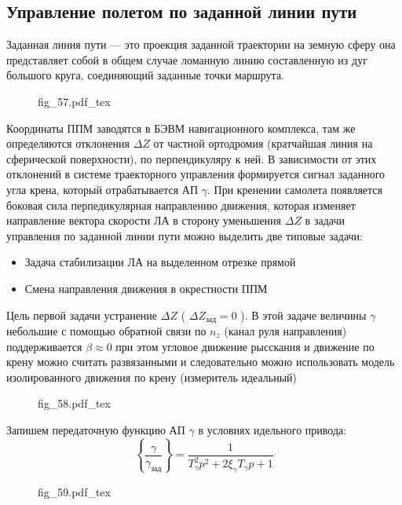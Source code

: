 \documentclass{article}
\newcommand{\incfig}[1]{
    {#1.pdf_tex}
}
\begin{document}
\subsection{Управление полетом по заданной линии пути}
Заданная линия пути --- это проекция заданной траектории на земную сферу она представляет собой в общем случае ломанную линию составленную из дуг большого круга, соединяющий заданные точки маршрута. 

\begin{figure}[ht]
	\centering
	\incfig{fig_57}
	\label{fig:fig_57}
\end{figure}

Координаты ППМ заводятся в БЭВМ навигационного комплекса, там же определяются отклонения $ \Delta Z$ от частной ортодромия (кратчайшая линия на сферической поверхности), по перпендикуляру к ней. В зависимости от этих отклонений в системе траекторного управления формируется сигнал заданного угла крена, который отрабатывается АП $\gamma$. При кренении самолета появляется боковая сила перпедикулярная направлению движения, которая изменяет направление вектора скорости ЛА в сторону уменьшения $\Delta Z$
в задачи управления по заданной линии пути можно выделить две типовые задачи:
\begin{itemize}
	\item Задача стабилизации ЛА на выделенном отрезке прямой
	\item Смена направления движения в окрестности ППМ
\end{itemize}
Цель первой задачи устранение $ \Delta Z$ ( $\Delta Z_\text{зад} = 0$ ). В этой задаче величины $\gamma$ небольшие с помощью обратной связи по $n_z$ (канал руля направления) поддерживается $\beta \approx 0$ при этом угловое движение рысскания и движение по крену можно считать развязанными и следовательно можно использовать модель изолированного движения по крену (измеритель идеальный)

\begin{figure}[H]
	\centering
	\incfig{fig_58}
	\label{fig:fig_58}
\end{figure}

Запишем передаточную функцию АП $\gamma$ в условиях идельного привода:
\[
	\left\{ \frac{\gamma}{\gamma_\text{зад}} \right\}  = \frac{1}{ T_\gamma^2 p^2 + 2 \xi_\gamma T_\gamma p + 1 }
\]

\begin{figure}[H]
	\centering
	\incfig{fig_59}
	\label{fig:fig_59}
\end{figure}
\end{document}
